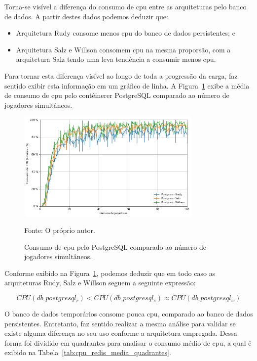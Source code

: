 Torna-se visível a diferença do consumo de \ac{cpu} entre as arquiteturas pelo banco de dados.
%
A partir destes dados podemos deduzir que:

\begin{itemize}
 \item Arquitetura Rudy consome menos \ac{cpu} do banco de dados persistentes; e \item Arquitetura Salz e Willson consomem \ac{cpu} na mesma proporsão, com a arquitetura Salz tendo uma leva tendência a consumir menos \ac{cpu}.
\end{itemize}

Para tornar esta diferença visível ao longo de toda a progressão da carga, faz sentido exibir esta informação em um gráfico de linha.
%
A Figura~\ref{fig:cpu_db_media_por_jogador} exibe a média de consumo de \ac{cpu} pelo contêinerer PostgreSQL comparado ao número de jogadores simultâneos.

\begin{figure}[htb!]
  \caption{Consumo de \ac{cpu} pelo PostgreSQL comparado ao número de jogadores simultâneos.}
  \label{fig:cpu_db_media_por_jogador}
  \includegraphics[width=0.8\textwidth]{figuras/analise/cpu_db_media_por_jogador.png}
  \centering

  Fonte: O próprio autor.
\end{figure}

Conforme exibido na Figura~\ref{fig:cpu_db_media_por_jogador}, podemos deduzir que em todo caso as arquiteturas Rudy, Salz e Willson seguem a seguinte expressão:

$$
    CPU(db\_postgresql_{r}) < CPU(db\_postgresql_{s}) \approx CPU(db\_postgresql_{w})
$$

O banco de dados temporários consome pouca \ac{cpu}, comparado ao banco de dados persistentes.
%
Entretanto, faz sentido realizar a mesma análise para validar se existe alguma diferença no seu uso conforme a arquitetura empregada.
%
Dessa forma foi dividido em quadrantes para analisar o consumo médio de \ac{cpu}, a qual é exibido na Tabela~\ref{tab:cpu_redis_media_quadrantes}.

